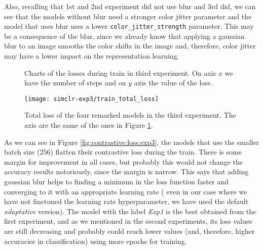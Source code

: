 Also, recalling that 1st and 2nd experiment did not use blur and 3rd did, we can see that the models without blur need a stronger color jitter parameter and the model that uses blur uses a lower \lstinline{color_jitter_strength} parameter. This may be a consequence of the blur, since we already know that applying a gaussian blur to an image smooths the color shifts in the image and, therefore, color jitter may have a lower impact on the representation learning.

\begin{figure}[htp] 
    \centering
    \hfill%
        \caption{Charts of the losses during train in third experiment. On axis $x$ we have the number of steps and on $y$ axis the value of the loss.}
        \label{fig:exp3:both:losses}
\end{figure}

\begin{figure}[H]
    \centering
    \texttt{[image: simclr-exp3/train\_total\_loss]}%
    \caption{Total loss of the four remarked models in the third experiment. The axis are the same of the ones in Figure \ref{fig:exp3:both:losses}. }
    \label{fig:total:loss:exp3}%
    \end{figure}

As we can see in Figure \ref{fig:contrastive:loss:exp3}, the models that use the smaller batch size ($256$) flatten their contrastive loss during the train. There is some margin for improvement in all cases, but probably this would not change the accuracy results notoriously, since the margin is narrow. This says that adding gaussian blur helps to finding a minimum in the loss function faster and converging to it with an appropriate learning rate ( even in our case where we have not finetuned the learning rate hyperparameter, we have used the default \emph{adaptative} version). The model with the label \emph{Exp1} is the best obtained from the first experiment, and as we mentioned in the second experiments, its loss values are still decreasing and probably could reach lower values (and, therefore, higher accuracies in classification) using more epochs for training.


